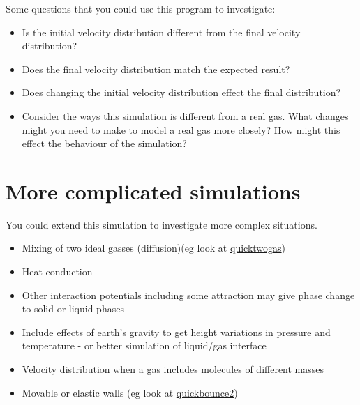 \documentclass[a4paper]{letter}
\begin{document}
Some questions that you could use this program to investigate:
\begin{itemize}
\item {Is the initial velocity distribution different from the final velocity distribution?}
\item{Does the final velocity distribution match the expected result?}
\item{Does changing the initial velocity distribution effect the final distribution?}
\item{Consider the ways this simulation is different from a real gas. 
What changes might you need to make to model a real gas more closely? 
How might this effect the behaviour of the simulation?}
\end{itemize}
\section{More complicated simulations}
You could extend this simulation to investigate more complex situations.
\begin{itemize}
\item{Mixing of two ideal gasses (diffusion)(eg look at \href{quicktwogas.html}{quicktwogas})}
\item{Heat conduction}
\item{Other interaction potentials including some attraction may give phase change to 
solid or liquid phases}
\item{Include effects of earth's gravity to get height variations in pressure and 
temperature - or better simulation of liquid/gas interface}
\item{Velocity distribution when a gas includes molecules of different masses} 
\item{Movable or elastic walls (eg look at \href{quickbounce2.html}{quickbounce2})}
\end{itemize}
\end{document}
